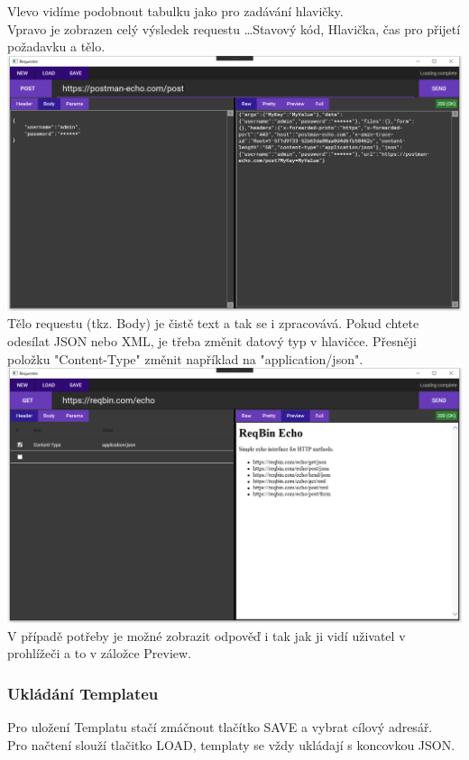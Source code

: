 \documentclass[a4paper]{article}
\begin{document}
        Vlevo vidíme podobnout tabulku jako pro zadávání hlavičky.\\
        Vpravo je zobrazen celý výsledek requestu \dots Stavový kód, 
        Hlavička, čas pro přijetí požadavku a tělo.\\
        \includegraphics[width=\textwidth]{secondPage.PNG}
        Tělo requestu (tkz. Body) je čistě text a tak se i zpracovává.
        Pokud chtete odesílat JSON nebo XML, je třeba změnit datový typ v hlavičce.
        Přesněji položku "Content-Type" změnit například na "application/json".\\
        \includegraphics[width=\textwidth]{Preview.PNG}
        V případě potřeby je možné zobrazit odpověď i tak jak ji vidí
        uživatel v prohlížeči a to v záložce Preview.
        \subsubsection{Ukládání Templateu}
            Pro uložení Templatu stačí zmáčnout tlačítko SAVE a vybrat cílový adresář.\\
            Pro načtení slouží tlačitko LOAD, templaty se vždy ukládají s koncovkou JSON.
\end{document}
